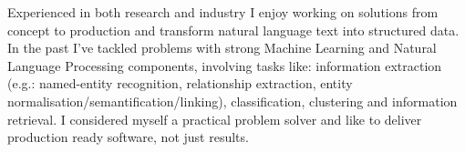 

\begin{cvparagraph}

Experienced in both research and industry I enjoy working on solutions from concept to production and transform natural language text into structured data. In the past I've tackled problems with strong Machine Learning and Natural Language Processing components, involving tasks like: information extraction (e.g.: named-entity recognition, relationship extraction, entity normalisation/semantification/linking), classification, clustering and information retrieval. I considered myself a practical problem solver and like to deliver production ready software, not just results.
\end{cvparagraph}
